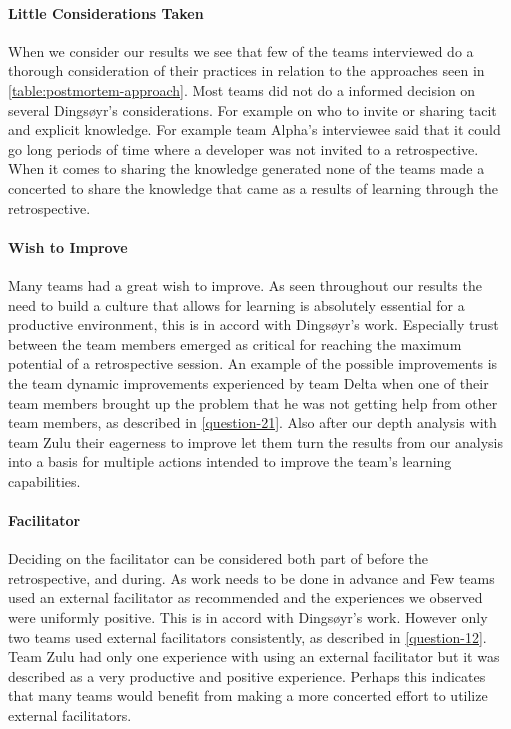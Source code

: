 \paragraph{Little Considerations Taken}
When we consider our results we see that few of the teams interviewed do a thorough consideration of their practices in relation to the approaches seen in \autoref{table:postmortem-approach}. Most teams did not do a informed decision on several Dingsøyr's considerations. For example on who to invite or sharing tacit and explicit knowledge. For example team Alpha's interviewee said that it could go long periods of time where a developer was not invited to a retrospective. When it comes to sharing the knowledge generated none of the teams made a concerted to share the knowledge that came as a results of learning through the retrospective.

\paragraph{Wish to Improve}
Many teams had a great wish to improve. As seen throughout our results the need to build a culture that allows for learning is absolutely essential for a productive environment, this is in accord with  Dingsøyr's work. Especially trust between the team members emerged as critical for reaching the maximum potential of a retrospective session. An example of the possible improvements is the team dynamic improvements experienced by team Delta when one of their team members brought up the problem that he was not getting help from other team members, as described in \autoref{question-21}. Also after our depth analysis with team Zulu their eagerness to improve let them turn the results from our analysis into a basis for multiple actions intended to improve the team's learning capabilities. 

\paragraph{Facilitator}
Deciding on the facilitator can be considered both part of before the retrospective, and during. As work needs to be done in advance and Few teams used an external facilitator as recommended and the experiences we observed were uniformly positive. This is in accord with Dingsøyr's work. However only two teams used external facilitators consistently, as described in \autoref{question-12}. Team Zulu had only one experience with using an external facilitator but it was described as a very productive and positive experience. Perhaps this indicates that many teams would benefit from making a more concerted effort to utilize external facilitators. 


